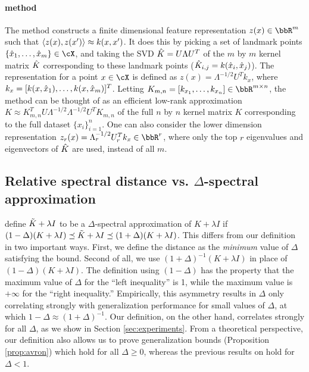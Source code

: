 \paragraph{\Nystrom method}
The \Nystrom method constructs a finite dimensional feature representation
$z(x) \in \RR^m$ such that $\left\langle z(x),z(x')\right\rangle \approx k(x,x')$.  It does this
by picking a set of landmark points $\{\hx_1,\ldots,\hx_m\} \in \cX$,
and taking the SVD $\hat{K} = U\Lambda U^T$ of the $m$ by $m$ 
kernel matrix $\hat{K}$ corresponding to these landmark points 
($\hat{K}_{i,j} = k(\hat{x}_i,\hat{x}_j)$).  The \Nystrom representation for a point $x \in \cX$
is defined as $z(x) = \Lambda^{-1/2} U^T k_x$, where $k_x = [k(x,\hat{x}_1),\ldots,k(x,\hat{x}_m)]^T$.
Letting $K_{m,n} = [k_{x_1},\ldots,k_{x_n}] \in \RR^{m\times n}$, 
the \Nystrom method can be thought of as an efficient low-rank approximation
$K \approx K_{m,n}^T U \Lambda^{-1/2}\Lambda^{-1/2} U^T K_{m,n}$ of the full
$n$ by $n$ kernel matrix $K$ corresponding to the full dataset $\{x_i\}_{i=1}^n$.
One can also consider the lower dimension \Nystrom representation
$z_r(x) = \Lambda_r^{-1/2} U_r^T k_x \in \RR^r$, where only the top $r$ eigenvalues and
eigenvectors of $\hat{K}$ are used, instead of all $m$.


\subsection{Relative spectral distance vs. $\Delta$-spectral approximation}
\citet{avron17} define $\tilde{K}+\lambda I$ to be a $\Delta$-spectral approximation of $K+\lambda I$ if $(1-\Delta)(K+\lambda I) \preceq \tilde{K} + \lambda I \preceq (1+\Delta)(K+\lambda I)$. This differs from our definition in two important ways. First, we define the distance as the \textit{minimum} value of $\Delta$ satisfying the bound.  Second of all, we use $(1+\Delta)^{-1}(K+\lambda I)$ in place of $(1-\Delta)(K+\lambda I)$. The definition using $(1-\Delta)$ has the property that the maximum value of $\Delta$ for the ``left inequality'' is 1, while the maximum value is $+\infty$ for the ``right inequality.'' Empirically, this asymmetry results in $\Delta$ only correlating strongly with generalization performance for small values of $\Delta$, at which $1-\Delta\approx (1+\Delta)^{-1}$. Our definition, on the other hand, correlates strongly for all $\Delta$, as we show in Section \ref{sec:experiments}.  From a theoretical perspective, our definition also allows us to prove generalization bounds (Proposition \ref{prop:avron}) which hold for all $\Delta \geq 0$, whereas the previous results on hold for $\Delta < 1$.